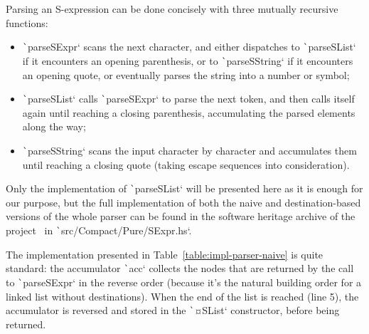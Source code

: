 \documentclass[english]{jflart}
\begin{document}
Parsing an S-expression can be done concisely with three mutually recursive functions:
\begin{itemize}
  \item \texttt`parseSExpr` scans the next character, and either dispatches to \texttt`parseSList` if it encounters an opening parenthesis, or to \texttt`parseSString` if it encounters an opening quote, or eventually parses the string into a number or symbol;
  \item \texttt`parseSList` calls \texttt`parseSExpr` to parse the next token, and then calls itself again until reaching a closing parenthesis, accumulating the parsed elements along the way;
  \item \texttt`parseSString` scans the input character by character and accumulates them until reaching a closing quote (taking escape sequences into consideration).
\end{itemize}

Only the implementation of \texttt`parseSList` will be presented here as it is enough for our purpose, but the full implementation of both the naive and destination-based versions of the whole parser can be found in the software heritage archive of the project~\cite{linear_dest} in \texttt`src/Compact/Pure/SExpr.hs`.

The implementation presented in Table~\ref{table:impl-parser-naive} is quite standard: the accumulator \texttt`acc` collects the nodes that are returned by the call to \texttt`parseSExpr` in the reverse order (because it's the natural building order for a linked list without destinations). When the end of the list is reached (line 5), the accumulator is reversed and stored in the \texttt`¤SList` constructor, before being returned.
\end{document}
